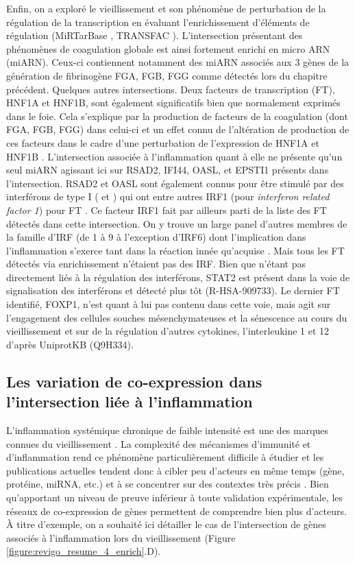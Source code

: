 Enfin, on a exploré le vieillissement et son phénomène de perturbation de la régulation de la transcription en évaluant l'enrichissement d'éléments de régulation (MiRTarBase \cite{Chou2018}, TRANSFAC \cite{Matys2006}). L'intersection présentant des phénomènes de coagulation globale est ainsi fortement enrichi en micro ARN (miARN). Ceux-ci contiennent notamment des miARN associés aux 3 gènes de la génération de fibrinogène FGA, FGB, FGG comme détectés lors du chapitre précédent. Quelques autres intersections. Deux facteurs de transcription (FT), HNF1A et HNF1B, sont également significatifs bien que normalement exprimés dans le foie. Cela s'explique par la production de facteurs de la coagulation (dont FGA, FGB, FGG) dans celui-ci et un effet connu de l'altération de production de ces facteurs dans le cadre d'une perturbation de l'expression de HNF1A et HNF1B \cite{Costa2003}. L'intersection associée à l'inflammation quant à elle ne présente qu'un seul miARN agissant ici sur RSAD2, IFI44, OASL, et EPSTI1 présents dans l'intersection. RSAD2 et OASL sont également connus pour être stimulé par des interférons de type I (\textalpha{} et \textbeta{}) qui ont entre autres IRF1 (pour \textit{interferon related factor 1}) pour FT \cite{Schoggins2011}. Ce facteur IRF1 fait par ailleurs parti de la liste des FT détectés dans cette intersection. On y trouve un large panel d'autres membres de la famille d'IRF (de 1 à 9 à l'exception d'IRF6) dont l'implication dans l'inflammation s'exerce tant dans la réaction innée qu’acquise \cite{Frisch2020}. Mais tous les FT détectés via enrichissement n'étaient pas des IRF. Bien que n'étant pas directement liés à la régulation des interférons, STAT2 est présent dans la voie de signalisation des interférons \textalpha{} et \textbeta{} détecté plus tôt (R-HSA-909733). Le dernier FT identifié, FOXP1, n'est quant à lui pas contenu dans cette voie, mais agit sur l'engagement des cellules souches mésenchymateuses et la sénescence au cours du vieillissement \cite{Infante2018} et sur de la régulation d'autres cytokines, l'interleukine 1 et 12 d'après UniprotKB (Q9H334).

\subsection{Les variation de co-expression dans l'intersection liée à l'inflammation}

L'inflammation systémique chronique de faible intensité est une des marques connues du vieillissement \cite{Lopez-Otin2013, Franchini2006}. La complexité des mécanismes d'immunité et d'inflammation rend ce phénomène particulièrement difficile à étudier et les publications actuelles tendent donc à cibler peu d'acteurs en même temps (gène, protéine, miRNA, etc.) et à se concentrer sur des contextes très précis \cite{Franceschi2017}. Bien qu'apportant un niveau de preuve inférieur à toute validation expérimentale, les réseaux de co-expression de gènes permettent de comprendre bien plus d'acteurs. À titre d'exemple, on a souhaité ici détailler le cas de l'intersection de gènes associés à l'inflammation lors du vieillissement (Figure \ref{figure:revigo_resume_4_enrich}.D).

